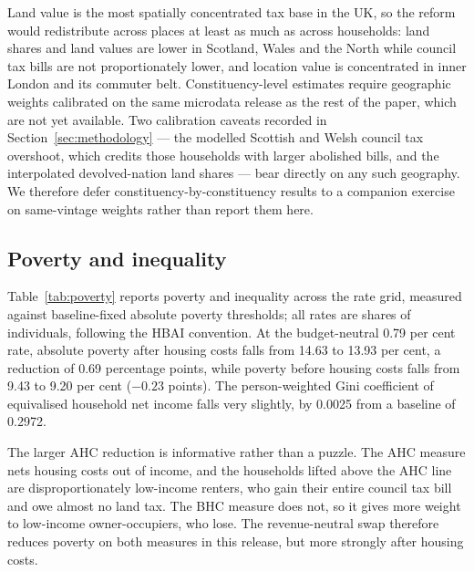 Land value is the most spatially concentrated tax base in the UK, so the reform would redistribute across places at least as much as across households: land shares and land values are lower in Scotland, Wales and the North while council tax bills are not proportionately lower, and location value is concentrated in inner London and its commuter belt. Constituency-level estimates require geographic weights calibrated on the same microdata release as the rest of the paper, which are not yet available. Two calibration caveats recorded in Section~\ref{sec:methodology} --- the modelled Scottish and Welsh council tax overshoot, which credits those households with larger abolished bills, and the interpolated devolved-nation land shares --- bear directly on any such geography. We therefore defer constituency-by-constituency results to a companion exercise on same-vintage weights rather than report them here.

\subsection{Poverty and inequality}
\label{sec:poverty}

Table~\ref{tab:poverty} reports poverty and inequality across the rate grid, measured against baseline-fixed absolute poverty thresholds; all rates are shares of individuals, following the HBAI convention. At the budget-neutral 0.79 per cent rate, absolute poverty after housing costs falls from 14.63 to 13.93 per cent, a reduction of 0.69 percentage points, while poverty before housing costs falls from 9.43 to 9.20 per cent ($-0.23$ points). The person-weighted Gini coefficient of equivalised household net income falls very slightly, by 0.0025 from a baseline of 0.2972.

The larger AHC reduction is informative rather than a puzzle. The AHC measure nets housing costs out of income, and the households lifted above the AHC line are disproportionately low-income renters, who gain their entire council tax bill and owe almost no land tax. The BHC measure does not, so it gives more weight to low-income owner-occupiers, who lose. The revenue-neutral swap therefore reduces poverty on both measures in this release, but more strongly after housing costs.


